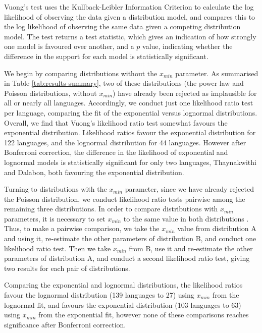 Vuong's \autocite*{vuong_likelihood_1989} test uses the Kullback-Leibler Information Criterion \autocite{kullback_information_1951} to calculate the log likelihood of observing the data given a distribution model, and compares this to the log likelihood of observing the same data given a competing distribution model. The test returns a test statistic, which gives an indication of how strongly one model is favoured over another, and a \(p\) value, indicating whether the difference in the support for each model is statistically significant.

We begin by comparing distributions without the \(x_{min}\) parameter. As summarised in Table \ref{tab:results-summary}, two of these distributions (the power law and Poisson distributions, without \(x_{min}\)) have already been rejected as implausible for all or nearly all languages. Accordingly, we conduct just one likelihood ratio test per language, comparing the fit of the exponential versus lognormal distributions. Overall, we find that Vuong's likelihood ratio test somewhat favours the exponential distribution. Likelihood ratios favour the exponential distribution for 122 languages, and the lognormal distribution for 44 languages. However after Bonferroni correction, the difference in the likelihood of exponential and lognormal models is statistically significant for only two languages, Thaynakwithi and Dalabon, both favouring the exponential distribution.

Turning to distributions with the \(x_{min}\) parameter, since we have already rejected the Poisson distribution, we conduct likelihood ratio tests pairwise among the remaining three distributions. In order to compare distributions with \(x_{min}\) parameters, it is necessary to set \(x_{min}\) to the same value in both distributions \autocite{gillespie_fitting_2014}. Thus, to make a pairwise comparison, we take the \(x_{min}\) value from distribution A and using it, re-estimate the other parameters of distribution B, and conduct one likelihood ratio test. Then we take \(x_{min}\) from B, use it and re-estimate the other parameters of distribution A, and conduct a second likelihood ratio test, giving two results for each pair of distributions.

Comparing the exponential and lognormal distributions, the likelihood ratios favour the lognormal distribution (139 languages to 27) using \(x_{min}\) from the lognormal fit, and favours the exponential distribution (103 languages to 63) using \(x_{min}\) from the exponential fit, however none of these comparisons reaches significance after Bonferroni correction.

